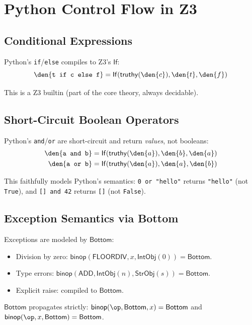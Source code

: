 \section{Python Control Flow in Z3}

\subsection{Conditional Expressions}

Python's \texttt{if}/\texttt{else} compiles to Z3's $\mathsf{If}$:
\[
  \den{\texttt{t if c else f}} = \mathsf{If}(\mathsf{truthy}(\den{c}),
    \den{t}, \den{f})
\]

This is a Z3 builtin (part of the core theory, always decidable).

\subsection{Short-Circuit Boolean Operators}

Python's \texttt{and}/\texttt{or} are short-circuit and return
\emph{values}, not booleans:
\begin{align}
  \den{\texttt{a and b}} &= \mathsf{If}(\mathsf{truthy}(\den{a}),
    \den{b}, \den{a}) \\
  \den{\texttt{a or b}} &= \mathsf{If}(\mathsf{truthy}(\den{a}),
    \den{a}, \den{b})
\end{align}

This faithfully models Python's semantics: \texttt{0 or "hello"}
returns \texttt{"hello"} (not \texttt{True}), and
\texttt{[] and 42} returns \texttt{[]} (not \texttt{False}).

\subsection{Exception Semantics via Bottom}

Exceptions are modeled by $\mathsf{Bottom}$:
\begin{itemize}
  \item Division by zero: $\mathsf{binop}(\mathsf{FLOORDIV}, x,
    \mathsf{IntObj}(0)) = \mathsf{Bottom}$.
  \item Type errors: $\mathsf{binop}(\mathsf{ADD},
    \mathsf{IntObj}(n), \mathsf{StrObj}(s)) = \mathsf{Bottom}$.
  \item Explicit raise: compiled to $\mathsf{Bottom}$.
\end{itemize}

$\mathsf{Bottom}$ propagates strictly:
$\mathsf{binop}(\op, \mathsf{Bottom}, x) = \mathsf{Bottom}$ and
$\mathsf{binop}(\op, x, \mathsf{Bottom}) = \mathsf{Bottom}$.

